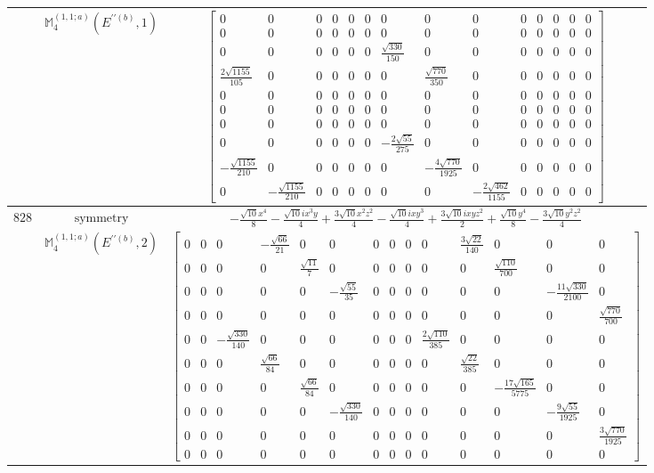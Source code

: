 \documentclass[fleqn,8pt,landscape]{jsarticle}
\begin{document}
\begin{longtable}{ccc}
$  $ & $ \mathbb{M}_{4}^{(1,1;a)}(E^{\prime\prime(b)},1) $ & $ \begin{bmatrix} 0 & 0 & 0 & 0 & 0 & 0 & 0 & 0 & 0 & 0 & 0 & 0 & 0 & 0 \\ 0 & 0 & 0 & 0 & 0 & 0 & 0 & 0 & 0 & 0 & 0 & 0 & 0 & 0 \\ 0 & 0 & 0 & 0 & 0 & 0 & \frac{\sqrt{330}}{150} & 0 & 0 & 0 & 0 & 0 & 0 & 0 \\ \frac{2 \sqrt{1155}}{105} & 0 & 0 & 0 & 0 & 0 & 0 & \frac{\sqrt{770}}{350} & 0 & 0 & 0 & 0 & 0 & 0 \\ 0 & 0 & 0 & 0 & 0 & 0 & 0 & 0 & 0 & 0 & 0 & 0 & 0 & 0 \\ 0 & 0 & 0 & 0 & 0 & 0 & 0 & 0 & 0 & 0 & 0 & 0 & 0 & 0 \\ 0 & 0 & 0 & 0 & 0 & 0 & 0 & 0 & 0 & 0 & 0 & 0 & 0 & 0 \\ 0 & 0 & 0 & 0 & 0 & 0 & - \frac{2 \sqrt{55}}{275} & 0 & 0 & 0 & 0 & 0 & 0 & 0 \\ - \frac{\sqrt{1155}}{210} & 0 & 0 & 0 & 0 & 0 & 0 & - \frac{4 \sqrt{770}}{1925} & 0 & 0 & 0 & 0 & 0 & 0 \\ 0 & - \frac{\sqrt{1155}}{210} & 0 & 0 & 0 & 0 & 0 & 0 & - \frac{2 \sqrt{462}}{1155} & 0 & 0 & 0 & 0 & 0 \end{bmatrix} $ \\ \hline
$ 828 $ & $ \text{symmetry} $ & $ - \frac{\sqrt{10} x^{4}}{8} - \frac{\sqrt{10} i x^{3} y}{4} + \frac{3 \sqrt{10} x^{2} z^{2}}{4} - \frac{\sqrt{10} i x y^{3}}{4} + \frac{3 \sqrt{10} i x y z^{2}}{2} + \frac{\sqrt{10} y^{4}}{8} - \frac{3 \sqrt{10} y^{2} z^{2}}{4} $ \\
$  $ & $ \mathbb{M}_{4}^{(1,1;a)}(E^{\prime\prime(b)},2) $ & $ \begin{bmatrix} 0 & 0 & 0 & - \frac{\sqrt{66}}{21} & 0 & 0 & 0 & 0 & 0 & 0 & \frac{3 \sqrt{22}}{140} & 0 & 0 & 0 \\ 0 & 0 & 0 & 0 & \frac{\sqrt{11}}{7} & 0 & 0 & 0 & 0 & 0 & 0 & \frac{\sqrt{110}}{700} & 0 & 0 \\ 0 & 0 & 0 & 0 & 0 & - \frac{\sqrt{55}}{35} & 0 & 0 & 0 & 0 & 0 & 0 & - \frac{11 \sqrt{330}}{2100} & 0 \\ 0 & 0 & 0 & 0 & 0 & 0 & 0 & 0 & 0 & 0 & 0 & 0 & 0 & \frac{\sqrt{770}}{700} \\ 0 & 0 & - \frac{\sqrt{330}}{140} & 0 & 0 & 0 & 0 & 0 & 0 & \frac{2 \sqrt{110}}{385} & 0 & 0 & 0 & 0 \\ 0 & 0 & 0 & \frac{\sqrt{66}}{84} & 0 & 0 & 0 & 0 & 0 & 0 & \frac{\sqrt{22}}{385} & 0 & 0 & 0 \\ 0 & 0 & 0 & 0 & \frac{\sqrt{66}}{84} & 0 & 0 & 0 & 0 & 0 & 0 & - \frac{17 \sqrt{165}}{5775} & 0 & 0 \\ 0 & 0 & 0 & 0 & 0 & - \frac{\sqrt{330}}{140} & 0 & 0 & 0 & 0 & 0 & 0 & - \frac{9 \sqrt{55}}{1925} & 0 \\ 0 & 0 & 0 & 0 & 0 & 0 & 0 & 0 & 0 & 0 & 0 & 0 & 0 & \frac{3 \sqrt{770}}{1925} \\ 0 & 0 & 0 & 0 & 0 & 0 & 0 & 0 & 0 & 0 & 0 & 0 & 0 & 0 \end{bmatrix} $ \\ \hline
\end{longtable}
\end{document}
